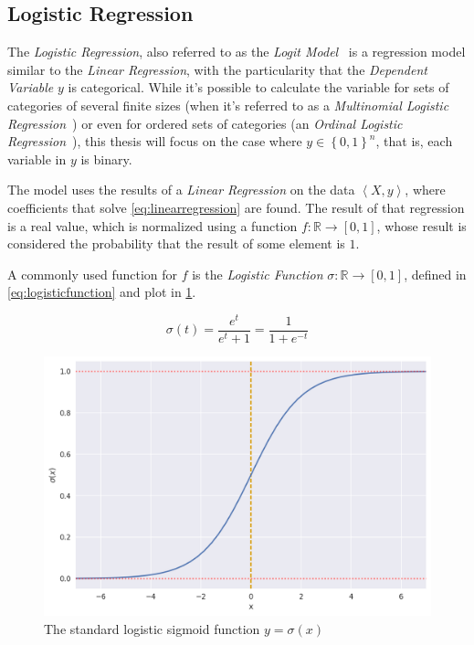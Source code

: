 \subsection{Logistic Regression}
\label{subsec:logisticregression}

The \emph{Logistic Regression}, also referred to as the \emph{Logit Model}~\cite{freedman2009statistical} is a regression model similar to the \emph{Linear Regression}, with the particularity that the \emph{Dependent Variable} $y$ is categorical. While it's possible to calculate the variable for sets of categories of several finite sizes (when it's referred to as a \emph{Multinomial Logistic Regression}~\cite{greene_econometric_2011}) or even for ordered sets of categories (an \emph{Ordinal Logistic Regression}~\cite{mccullagh1980ordinal}), this thesis will focus on the case where $y \in {\left\{ 0, 1 \right\}}^n$, that is, each variable in $y$ is binary.

The model uses the results of a \emph{Linear Regression} on the data $\left< X, y \right>$, where coefficients that solve \cref{eq:linearregression} are found. The result of that regression is a real value, which is normalized using a function $f : \mathbb{R} \rightarrow \left[ 0, 1 \right]$, whose result is considered the probability that the result of some element is $1$.

A commonly used function for $f$ is the \emph{Logistic Function} $\sigma : \mathbb{R} \rightarrow \left[ 0, 1 \right]$, defined in \cref{eq:logisticfunction} and plot in \cref{fig:sigmoid}.

\begin{equation}
\label{eq:logisticfunction}
\sigma \left( t \right) = \frac{e^t}{e^t + 1} = \frac{1}{1 + e^{-t}}
\end{equation}

\begin{figure}
\centering
\includegraphics[height=.33\textheight]{figures/sigmoid.png}
\caption{The standard logistic sigmoid function $y = \sigma(x)$}
\label{fig:sigmoid}
\end{figure}

